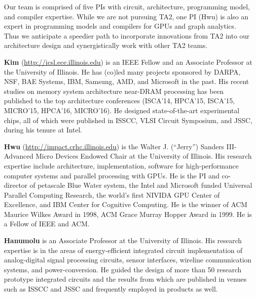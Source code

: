 Our team is comprised of five PIs with circuit, architecture, programming model, and compiler expertise. 
While we are not pursuing TA2, one PI (Hwu) is also an expert in programming models and compilers for GPUs and graph analytics. 
Thus we anticipate a speedier path to incorporate innovations from TA2 into our architecture design and synergistically work with other TA2 teams.

\vspace{3pt}
\noindent
\textbf{Kim} (\url{http://icsl.ece.illinois.edu}) is an IEEE Fellow and an Associate Professor at the University of Illinois. 
He has (co)led many projects sponsored by DARPA, NSF, BAE Systems, IBM, Samsung, AMD, and Microsoft in the past. 
His recent studies on memory system architecture near-DRAM processing has been published to the top architecture conferences (ISCA'14, HPCA'15, ISCA'15, MICRO'15, HPCA'16, MICRO'16).
He designed state-of-the-art experimental chips, all of which were published in ISSCC, VLSI Circuit Symposium, and JSSC, during his tenure at Intel.

\vspace{3pt}
\noindent
\textbf{Hwu} (\url{http://impact.crhc.illinois.edu}) is the Walter J. (``Jerry'') Sanders III-Advanced Micro Devices Endowed Chair at the University of Illinois. 
His research expertise include architecture, implementation, software for high-performance computer systems and parallel processing with GPUs. 
He is the PI and co-director of petascale Blue Water system, the Intel and Microsoft funded Universal Parallel Computing Research, the world's first NIVIDA GPU Center of Excellence, and IBM Center for Cognitive Computing. 
He is the winner of ACM Maurice Wilkes Award in 1998, ACM Grace Murray Hopper Award in 1999. He is a Fellow of IEEE and ACM.

\vspace{3pt}
\noindent
\textbf{Hanumolu} is an Associate Professor at the University of Illinois. 
His research expertise is in the areas of energy-efficient integrated circuit implementation of analog-digital signal processing circuits, sensor interfaces, wireline communication systems, and power-conversion. 
He guided the design of more than 50 research prototype integrated circuits and the results from which are published in venues such as ISSCC and JSSC and frequently employed in products as well.   


